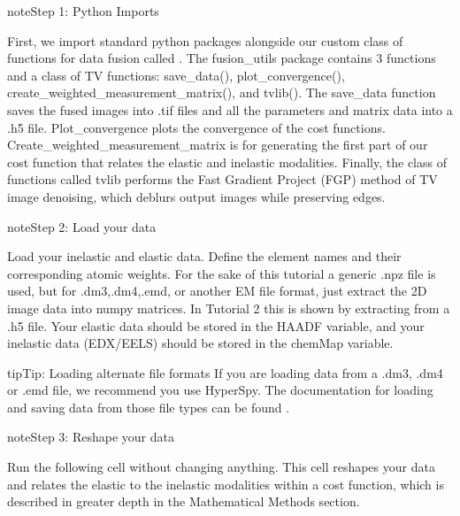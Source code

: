 \documentclass[letterpaper,10pt,english]{jupyterBook}
\begin{document}
\begin{sphinxadmonition}{note}{Step 1: Python Imports}

\sphinxAtStartPar
First, we import standard python packages alongside our custom class of functions for data fusion called . The fusion\_utils package contains 3 functions and a class of TV functions: save\_data(), plot\_convergence(), create\_weighted\_measurement\_matrix(), and tvlib(). The save\_data function saves the fused images into .tif files and all the parameters and matrix data into a .h5 file. Plot\_convergence plots the convergence of the cost functions. Create\_weighted\_measurement\_matrix is for generating the first part of our cost function that relates the elastic and inelastic modalities. Finally, the class of functions called tvlib performs the Fast Gradient Project (FGP) method of TV image denoising, which deblurs output images while preserving edges.
\end{sphinxadmonition}

\begin{sphinxadmonition}{note}{Step 2: Load your data}

\sphinxAtStartPar
Load your inelastic and elastic data. Define the element names and their corresponding atomic weights. For the sake of this tutorial a generic .npz file is used, but for .dm3,.dm4,.emd, or another EM file format, just extract the 2D image data into numpy matrices. In Tutorial 2 this is shown by extracting from a .h5 file. Your elastic data should be stored in the HAADF variable, and your inelastic data (EDX/EELS) should be stored in the chemMap variable.
\end{sphinxadmonition}

\begin{sphinxadmonition}{tip}{Tip:}
\sphinxAtStartPar
Loading alternate file formats
If you are loading data from a .dm3, .dm4 or .emd file, we recommend you use HyperSpy.  The documentation for loading and saving data from those file types can be found .
\end{sphinxadmonition}

\begin{sphinxadmonition}{note}{Step 3: Reshape your data}

\sphinxAtStartPar
Run the following cell without changing anything.  This cell reshapes your data and relates the elastic to the inelastic modalities within a cost function, which is described in greater depth in the Mathematical Methods section.
\end{sphinxadmonition}
\end{document}
